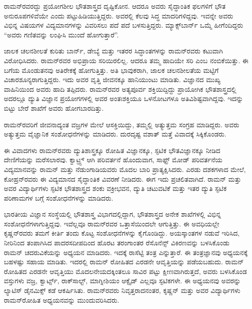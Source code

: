 ರಾಮನ್‍ರವರದ್ದು ಪ್ರಯೋಗಶೀಲ ಭೌತಶಾಸ್ತ್ರದ ದೃಷ್ಟಿಕೋನ. ಆದರೂ ಅವರು ಸೈದ್ಧಾಂತಿಕ ಫಲಗಳಿಗೆ ಭೌತ ಅನುರೂಪಗಳಿವೆಯೇ ಎಂದು ಪಟ್ಟುಹಿಡಿಯುತ್ತಿದ್ದರು. ಅವರಲ್ಲಿ ಕೆಲವು ಸಿದ್ಧ ಮಾದರಿಗಳಿದ್ದವು. ಇವನ್ನೇ ಅವರು ವಿಭಿನ್ನ ವಿಷಯಗಳ ವಿದ್ಯಮಾನಗಳನ್ನು ವಿವರಿಸಲು ಪದೆ ಪದೆ ಬಳಸುತ್ತಿದ್ದರು. ಮ್ಯಾಕ್ಸ್‌ಬಾರ್ನ್ ಒಮ್ಮೆ ಹೀಗೆಂದಿದ್ದರು “ಅವರು ಗಣಿತವನ್ನು ಲಂಘಿಸಿ ಮುಂದೆ ಹೋಗುತ್ತಾರೆ”.

ಜಾಲಕ ಚಲನಶೀಲತೆ ಕುರಿತು ಬಾರ್ನ್, ಡೇಬ್ಯೆ ಮತ್ತು ಇತರರ ಸಿದ್ಧಾಂತಗಳನ್ನು ರಾಮನ್‍ರವರು ಕಟುವಾಗಿ ವಿರೋಧಿಸಿದರು. ರಾಮನ್‍ರವರ ಅಭಿಪ್ರಾಯ ಸರಿಯಿರಲಿಲ್ಲ. ಆದರೂ ತಮ್ಮ ಹಾದಿಯೇ ಸರಿ ಎಂಬ ನಂಬಿಕೆಯಿತ್ತು. ಈ ಬಗೆಯ ಮೊಂಡುತನವು ಅತಿರೇಕಕ್ಕೆ ಹೋಗುತ್ತಿತ್ತು. ಅತಿ ಭಾವುಕರಾಗಿ, ಜಾಲಕ ಚಲನಶೀಲತೆಯ ಮಟ್ಟಿಗೆ ವಿಚಾರಶೂನ್ಯರಾಗುತ್ತಿದ್ದರು. ಇದು ಅವರ ವೃತ್ತಿ ಜೀವನಕ್ಕೂ ಹಾನಿಯುಂಟು ಮಾಡಿತು. ವಿಜ್ಞಾನದ ಮುಖ್ಯ ವಾಹಿನಿಯಿಂದ ಅವರು ಹಾದಿ ತಪ್ಪಿದರು. ರಾಮನ್‍ರವರ ಅತ್ಯಪೂರ್ವ ಶಕ್ತಿಯಿದ್ದಿದ್ದು ಪ್ರಾಯೋಗಿಕ ಭೌತಶಾಸ್ತ್ರದಲ್ಲಿ ಅದರಲ್ಲೂ ದ್ಯುತಿ ವಿಜ್ಞಾನ ಪ್ರಯೋಗಗಳಲ್ಲಿ ಅವರ ಅಂತಃಶಕ್ತಿಯೂ ಒಳನೋಟಗಳೂ ಅತಿವಿಶಿಷ್ಟವಾಗಿದ್ದವು. ಇದನ್ನು ಬಿಟ್ಟು ಬೇರೆ ಶಾಖೆಗೆ ಅವರು ಹೋಗಬಾರದಿತ್ತು.

ರಾಮನ್‍ರವರಿಗೆ ಜೀವನಾದ್ಯಂತ ವಜ್ರಗಳ ಮೇಲೆ ಆಸಕ್ತಿಯಿದ್ದು, ತಮ್ಮಲ್ಲಿ ಅತ್ಯುತ್ತಮ ಸಂಗ್ರಹ ಮಾಡಿದ್ದರು. ಅವರು ಅತ್ಯುತ್ತಮ ವೈಜ್ಞಾನಿಕ ಸಂಶೋಧನೆಗಳನ್ನು ಮಾಡಿದರು. ದುರದೃಷ್ಟ ವಶಾತ್ ಮತ್ತೆ ವಿವಾದಕ್ಕೆ ಸಿಕ್ಕಿಕೊಂಡರು.

ಈ ವಿವಾದಗಳು ರಾಮನ್‍ರವರು ದ್ಯುತಿಶಾಸ್ತ್ರಕ್ಕೂ ರೋಹಿತ ವಿಜ್ಞಾನಕ್ಕೂ, ಸ್ಫಟಿಕ ಭೌತವಿಜ್ಞಾನಕ್ಕೂ ನೀಡಿದ ದೇಣಿಗೆಯನ್ನು ಮರೆಸಲಾರವು. ಕ್ವಾಟ್ರ್ಸ್ ಆಗಿ ಪರಿವರ್ತನೆ ಹೊಂದುವಾಗ, ಸಾಫ್ಟ್ ಮೋಡ್ ಪರಿವರ್ತನೆಯ ವಿದ್ಯಮಾನವನ್ನು ರಾಮನ್ ಮತ್ತು ನೆಡುಂಗಾಡಿಯವರು ಮೊದಲ ಬಾರಿ ಪ್ರಾತ್ಯಕ್ಷಿಸಿದರು. ಎರಡು ದಶಕಗಳಾದ ಮೇಲೆ, ಕೋಹ್ರನ್‍ರವರು ಈ ವಿದ್ಯಮಾನದ ಸೈದ್ಧಾಂತಿಕ ವಿವರಣೆ ನೀಡಿದರು. ಈಗ ಇದು ಪ್ರಚಲಿತವಾಗಿದೆ. ರಾಮನ್ ಮತ್ತು ಅವರ ವಿದ್ಯಾರ್ಥಿಗಳು ಸ್ಫಟಿಕ ಭೌತಶಾಸ್ತ್ರದ ಶಂಕು ವಕ್ರೀಭವನ, ದ್ಯುತಿ ಚಟುವಟಿಕೆ ಮತ್ತು ಇತರ ದ್ಯುತಿ ಸ್ಫಟಿಕ ಪರಿಣಾಮಗಳ ಬಗ್ಗೆ ಸಂಶೋಧನೆಗಳನ್ನು ಮಾಡಿದರು.

ಭಾರತೀಯ ವಿಜ್ಞಾನ ಸಂಸ್ಥೆಯಲ್ಲಿ ಭೌತಶಾಸ್ತ್ರ ವಿಭಾಗದಲ್ಲಿದ್ದಾಗ, ಭೌತಶಾಸ್ತ್ರದ ಅನೇಕ ಶಾಖೆಗಳಲ್ಲಿ ವಿಭಿನ್ನ ಸಂಶೋಧನೆಗಳಾಗುತ್ತಿದ್ದವು. ಇವೆಲ್ಲವೂ ರಾಮನ್‍ರವರ ಒತ್ತಾಸೆಯಿಂದಲೇ ಆಗುತ್ತಿತ್ತು. ಈ ಅವಧಿಯಲ್ಲೇ ಕೃಷ್ಣನ್‍ರವರು ತಮಗೆ ಕೀರ್ತಿ ತಂದು ಕೊಟ್ಟ ಸಂಶೋಧನೆಗಳನ್ನು ಕೈಗೊಂಡಿದ್ದು. ಅಯಸ್ಕಾಂತಗಳ ನಡುವೆ ಇರಿಸಿದ, ನೀರಿನಿಂದ ತಂಪಾಗಿಸಿದ ಪಾದರಸದೀಪದಿಂದ ಹೊರಟ ತರಂಗಾಂತರ  ರೆಸೊನೆನ್ಸ್ ವಿಕಿರಣವನ್ನು ಬಳಸಿಕೊಂಡು ರಾಮನ್ ಚದರುವಿಕೆ\-ಯನ್ನು ಅಧ್ಯಯನ ಮಾಡಿದರು. ಇದಕ್ಕೆ ರಾಸೆಟ್ಟಿ ತಂತ್ರ ಎನ್ನುತ್ತಾರೆ. ಈ ತಂತ್ರಜ್ಞಾನವು ಅಧ್ಯಯನಕ್ಕೆ ಬಹಳಷ್ಟು ಸಹಾಯ ಮಾಡಿತು. ಇದರಲ್ಲಿ ರಾಮನ್ ರೋಹಿತದ  ಎರಡನೇ ಆವೃತ್ತಿಯನ್ನು ಪಡೆಯಬಹುದು. ರಾಮನ್ ರೋಹಿತದ  ಎರಡನೇ ಆವೃತ್ತಿಯು ಮೊದಲನೇಯದಕ್ಕಿಂತಲೂ ಸಾವಿರ ಪಟ್ಟು ಕ್ಷೀಣವಾಗಿರುತ್ತದೆ, ಅವರು ಬಳಸಿಕೊಂಡ ವಸ್ತುಗಳು ವಜ್ರ, ಕ್ವಾರ್ಟ್ಸ್, ರಾಕ್‍ಸಾಲ್ಟ್, ಮಾಗ್ನೀಶಿಯಂ ಆಕ್ಸೈಡ್ ಎಲ್ಲವೂ ಸ್ಫಟಿಕಗಳೇ. ಈ ಅಧ್ಯಯನವು ಅವರನ್ನು ಲ್ಯಾಟಿಸ್ ಡೈನಮಿಕ್ಸ್ ಕಡೆ ಆಕರ್ಷಿಸಿತು. ರಾಮನ್‍ರವರು ನಿವೃತ್ತರಾದನಂತರ, ಕೃಷ್ಣನ್ ಮತ್ತು ಅವರ ವಿದ್ಯಾರ್ಥಿಗಳು ರಾಮನ್‍ರೋಹಿತ ಅಧ್ಯಯನವನ್ನು ಮುಂದುವರಿಸಿದರು.

